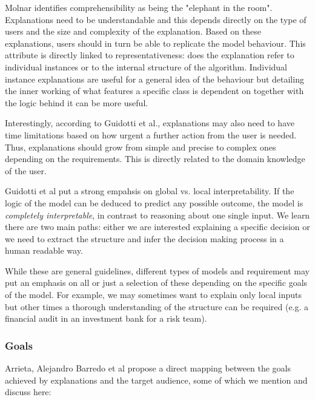 \documentclass[proposal]{softeng}
\begin{document}
Molnar identifies comprehensibility as being the "elephant in the room". Explanations need to be understandable and this depends directly on the type of users and the size and complexity of the explanation. Based on these explanations, users should in turn be able to replicate the model behaviour. This attribute is directly linked to representativeness: does the explanation refer to individual instances or to the internal structure of the algorithm. Individual instance explanations are useful for a general idea of the behaviour but detailing the inner working of what features a specific class is dependent on together with the logic behind it can be more useful.

Interestingly, according to Guidotti et al., explanations may also need to have time limitations based on how urgent a further action from the user is needed. Thus, explanations should grow from simple and precise to complex ones depending on the requirements. This is directly related to the domain knowledge of the user. 

Guidotti et al put a strong empahsis on global vs. local interpretability. If the logic of the model can be deduced to predict any possible outcome, the model is \textit{completely interpretable}, in contrast to reasoning about one single input. We learn there are two main paths: either we are interested explaining a specific decision or we need to extract the structure and infer the decision making process in a human readable way.

While these are general guidelines, different types of models and requirement may put an emphasis on all or just a selection of these depending on the specific goals of the model. For example, we may sometimes want to explain only local inputs but other times a thorough understanding of the structure can be required (e.g. a financial audit in an investment bank for a risk team). 

\subsubsection{Goals}

Arrieta, Alejandro Barredo et al\cite{BarredoArrietaAlejandro2020EAIX} propose a direct mapping between the goals achieved by explanations and the target audience, some of which we mention and discuss here:
\end{document}
